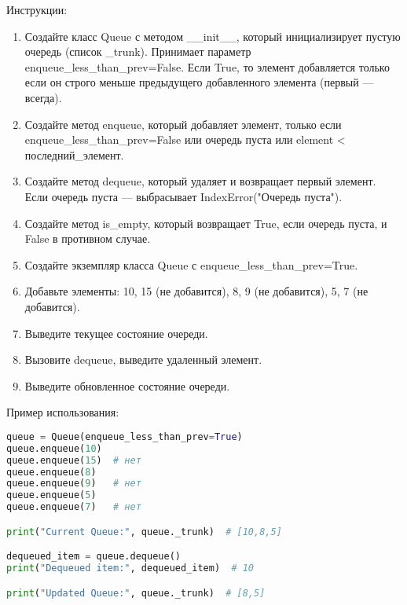 \begin{enumerate}
Инструкции:
\begin{enumerate}
    \item Создайте класс Queue с методом \_\_init\_\_, который инициализирует пустую очередь (список \_trunk). Принимает параметр enqueue\_less\_than\_prev=False. Если True, то элемент добавляется только если он строго меньше предыдущего добавленного элемента (первый — всегда).
    \item Создайте метод enqueue, который добавляет элемент, только если enqueue\_less\_than\_prev=False или очередь пуста или element < последний\_элемент.
    \item Создайте метод dequeue, который удаляет и возвращает первый элемент. Если очередь пуста — выбрасывает IndexError("Очередь пуста").
    \item Создайте метод is\_empty, который возвращает True, если очередь пуста, и False в противном случае.
    \item Создайте экземпляр класса Queue с enqueue\_less\_than\_prev=True.
    \item Добавьте элементы: 10, 15 (не добавится), 8, 9 (не добавится), 5, 7 (не добавится).
    \item Выведите текущее состояние очереди.
    \item Вызовите dequeue, выведите удаленный элемент.
    \item Выведите обновленное состояние очереди.
\end{enumerate}

Пример использования:
\begin{lstlisting}[language=Python]
queue = Queue(enqueue_less_than_prev=True)
queue.enqueue(10)
queue.enqueue(15)  # нет
queue.enqueue(8)
queue.enqueue(9)   # нет
queue.enqueue(5)
queue.enqueue(7)   # нет

print("Current Queue:", queue._trunk)  # [10,8,5]

dequeued_item = queue.dequeue()
print("Dequeued item:", dequeued_item)  # 10

print("Updated Queue:", queue._trunk)  # [8,5]
\end{lstlisting}

\end{enumerate}